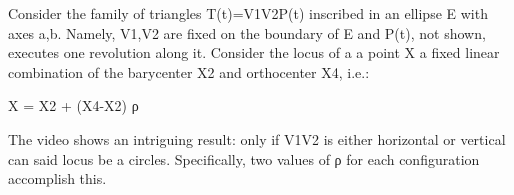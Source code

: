 Consider the family of triangles T(t)=V1V2P(t) inscribed in an ellipse E with axes a,b. Namely, V1,V2 are fixed on the boundary of E and P(t), not shown, executes one revolution along it. Consider the locus of a a point X a fixed linear combination of the barycenter X2 and orthocenter X4, i.e.:

X = X2 + (X4-X2) ρ

The video shows an intriguing result: only if V1V2 is either horizontal or vertical can said locus be a circles. Specifically, two values of ρ for each configuration accomplish this.